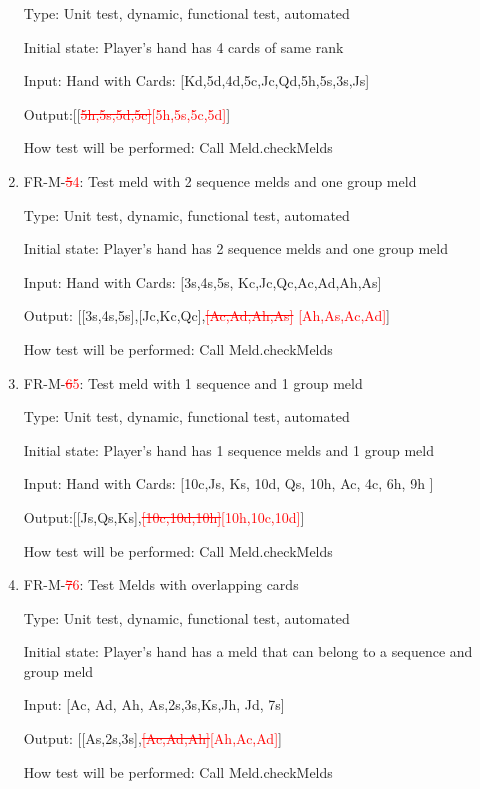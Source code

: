 \documentclass[12pt, titlepage]{article}
\begin{document}
\begin{enumerate}
    Type: Unit test, dynamic, functional test, automated
    
    Initial state: Player's hand has 4 cards of same rank
    
    Input: Hand with Cards: [Kd,5d,4d,5c,Jc,Qd,5h,5s,3s,Js]
    
    Output:[[\textcolor{red}{\sout{5h,5s,5d,5c]}[5h,5s,5c,5d]}]
    
    How test will be performed: Call Meld.checkMelds
    
    \item{FR-M-\textcolor{red}{\sout{{5}}4}: Test meld with 2 sequence melds and one group meld}
    
    Type: Unit test, dynamic, functional test, automated
    
    Initial state: Player's hand has 2 sequence melds and one group meld
    
    Input: Hand with Cards: [3s,4s,5s, Kc,Jc,Qc,Ac,Ad,Ah,As]
    
    Output: [[3s,4s,5s],[Jc,Kc,Qc],\textcolor{red}{\sout{[Ac,Ad,Ah,As]} [Ah,As,Ac,Ad]}]
    
    How test will be performed: Call Meld.checkMelds
    
    \item{FR-M-\textcolor{red}{\sout{{6}}5}: Test meld with 1 sequence and 1 group meld}
    
    Type: Unit test, dynamic, functional test, automated
    
    Initial state: Player's hand has 1 sequence melds and 1 group meld
    
    Input:  Hand with Cards: [10c,Js, Ks, 10d, Qs, 10h, Ac, 4c, 6h, 9h ]
    
    Output:[[Js,Qs,Ks],\textcolor{red}{\sout{[10c,10d,10h]}[10h,10c,10d]}]
    
    How test will be performed: Call Meld.checkMelds
    
    \item{FR-M-\textcolor{red}{\sout{{7}}6}: Test Melds with overlapping cards}
    
    Type: Unit test, dynamic, functional test, automated 
    
    Initial state: Player's hand has a meld that can belong to a sequence and group meld
    
    Input: [Ac, Ad, Ah, As,2s,3s,Ks,Jh, Jd, 7s]
    
    Output: [[As,2s,3s],\textcolor{red}{\sout{[Ac,Ad,Ah]}[Ah,Ac,Ad]}]
    
    How test will be performed: Call Meld.checkMelds
\end{enumerate}
\end{document}
